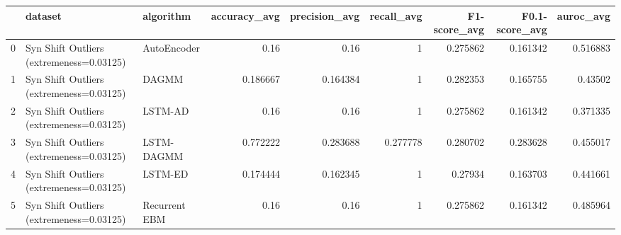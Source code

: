 \begin{tabular}{rllrrrrrr}
\hline
    & dataset                                  & algorithm     &   accuracy\_avg &   precision\_avg &   recall\_avg &   F1-score\_avg &   F0.1-score\_avg &   auroc\_avg \\
\hline
  0 & Syn Shift Outliers (extremeness=0.03125) & AutoEncoder   &       0.16     &        0.16     &     1        &       0.275862 &         0.161342 &    0.516883 \\
  1 & Syn Shift Outliers (extremeness=0.03125) & DAGMM         &       0.186667 &        0.164384 &     1        &       0.282353 &         0.165755 &    0.43502  \\
  2 & Syn Shift Outliers (extremeness=0.03125) & LSTM-AD       &       0.16     &        0.16     &     1        &       0.275862 &         0.161342 &    0.371335 \\
  3 & Syn Shift Outliers (extremeness=0.03125) & LSTM-DAGMM    &       0.772222 &        0.283688 &     0.277778 &       0.280702 &         0.283628 &    0.455017 \\
  4 & Syn Shift Outliers (extremeness=0.03125) & LSTM-ED       &       0.174444 &        0.162345 &     1        &       0.27934  &         0.163703 &    0.441661 \\
  5 & Syn Shift Outliers (extremeness=0.03125) & Recurrent EBM &       0.16     &        0.16     &     1        &       0.275862 &         0.161342 &    0.485964 \\
\hline
\end{tabular}

